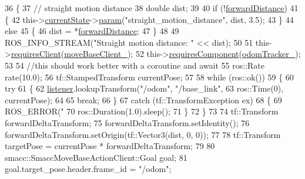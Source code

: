 \begin{DoxyCode}
36     \{
37         \textcolor{comment}{// straight motion distance}
38         \textcolor{keywordtype}{double} dist;
39 
40         \textcolor{keywordflow}{if} (!\hyperlink{classsm__dance__bot_1_1SbNavigateForward_a2b828c7cd081219448112a2161a62aab}{forwardDistance})
41         \{
42             this->\hyperlink{classsmacc_1_1SmaccSubStateBehavior_a62e2b9da4a446f09396d0b4c01659b88}{currentState}->\hyperlink{classsmacc_1_1ISmaccState_a4982f2187ed6da337462721146e8ef70}{param}(\textcolor{stringliteral}{"straight\_motion\_distance"}, dist, 3.5);
43         \}
44         \textcolor{keywordflow}{else}
45         \{
46             dist = *\hyperlink{classsm__dance__bot_1_1SbNavigateForward_a2b828c7cd081219448112a2161a62aab}{forwardDistance};
47         \}
48 
49         ROS\_INFO\_STREAM(\textcolor{stringliteral}{"Straight motion distance: "} << dist);
50 
51         this->\hyperlink{classsmacc_1_1SmaccSubStateBehavior_ae8361a9e794b02f9f3d962b881e4fd7d}{requiresClient}(\hyperlink{classsm__dance__bot_1_1SbNavigateForward_a968e1e81e922971fbb7b658e644ce36f}{moveBaseClient\_});
52         this->\hyperlink{classsmacc_1_1SmaccSubStateBehavior_a9f31f62f886cc06017e92fa0d834b12d}{requiresComponent}(\hyperlink{classsm__dance__bot_1_1SbNavigateForward_ab52cc8f5bf6478324a4d3cc42a03a869}{odomTracker\_});
53 
54         \textcolor{comment}{//this should work better with a coroutine and await}
55         ros::Rate rate(10.0);
56         tf::StampedTransform currentPose;
57 
58         \textcolor{keywordflow}{while} (ros::ok())
59         \{
60             \textcolor{keywordflow}{try}
61             \{
62                 \hyperlink{classsm__dance__bot_1_1SbNavigateForward_ab27255d8f6ae1320acda4fdb092f0df3}{listener}.lookupTransform(\textcolor{stringliteral}{"/odom"}, \textcolor{stringliteral}{"/base\_link"},
63                                          ros::Time(0), currentPose);
64 
65                 \textcolor{keywordflow}{break};
66             \}
67             \textcolor{keywordflow}{catch} (tf::TransformException ex)
68             \{
69                 ROS\_ERROR(\textcolor{stringliteral}{"%
70                 ros::Duration(1.0).sleep();
71             \}
72         \}
73 
74         tf::Transform forwardDeltaTransform;
75         forwardDeltaTransform.setIdentity();
76         forwardDeltaTransform.setOrigin(tf::Vector3(dist, 0, 0));
77 
78         tf::Transform targetPose = currentPose * forwardDeltaTransform;
79 
80         smacc::SmaccMoveBaseActionClient::Goal goal;
81         goal.target\_pose.header.frame\_id = \textcolor{stringliteral}{"/odom"};
}
\end{DoxyCode}
